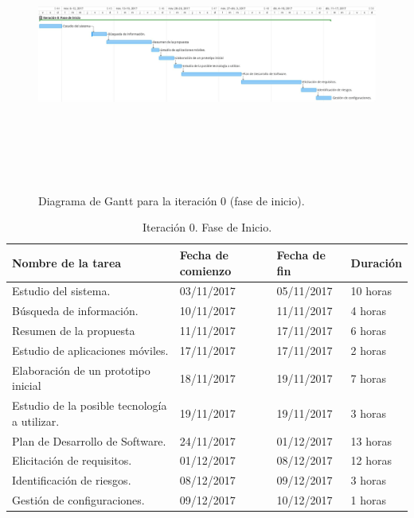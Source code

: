 \documentclass[twoside]{report}
\begin{document}
\begin{figure}[h]
\begin{center}
\includegraphics[height=9cm, width=\textwidth]{images/gantt/ite0}
\caption{Diagrama de Gantt para la iteración 0 (fase de inicio).}
\end{center}
\end{figure}

\begin{table}[H]
\centering
	\begin{tabular}{|l|l|l|l|}
    \hline
    Nombre de la tarea                           & Fecha de comienzo & Fecha de fin & Duración \\ \hline
    Estudio del sistema.                         & 03/11/2017        & 05/11/2017   & 10 horas  \\ \hline
    Búsqueda de información.                     & 10/11/2017        & 11/11/2017   & 4 horas   \\ \hline
    Resumen de la propuesta                      & 11/11/2017        & 17/11/2017   & 6 horas   \\ \hline
    Estudio de aplicaciones móviles.             & 17/11/2017        & 17/11/2017   & 2 horas   \\ \hline
    Elaboración de un prototipo inicial          & 18/11/2017        & 19/11/2017   & 7 horas   \\ \hline
    Estudio de la posible tecnología a utilizar. & 19/11/2017        & 19/11/2017   & 3 horas   \\ \hline
    Plan de Desarrollo de Software.              & 24/11/2017        & 01/12/2017   & 13 horas   \\ \hline
    Elicitación de requisitos.                   & 01/12/2017        & 08/12/2017   & 12 horas   \\ \hline
    Identificación de riesgos.                   & 08/12/2017        & 09/12/2017   & 3 horas   \\ \hline
    Gestión de configuraciones.                  & 09/12/2017        & 10/12/2017   & 1 horas   \\ \hline
    \end{tabular}
    \caption{Iteración 0. Fase de Inicio.}
\end{table}
\end{document}
